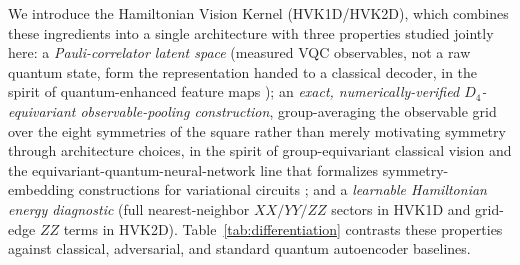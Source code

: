\documentclass[sn-mathphys,Numbered]{sn-jnl}
\begin{document}
We introduce the Hamiltonian Vision Kernel (HVK1D/HVK2D), which combines these ingredients into a single architecture with three properties studied jointly here: a \emph{Pauli-correlator latent space} (measured VQC observables, not a raw quantum state, form the representation handed to a classical decoder, in the spirit of quantum-enhanced feature maps \cite{Havlicek2019}); an \emph{exact, numerically-verified $D_4$-equivariant observable-pooling construction}, group-averaging the observable grid over the eight symmetries of the square rather than merely motivating symmetry through architecture choices, in the spirit of group-equivariant classical vision \cite{Cohen2016, Bronstein2021} and the equivariant-quantum-neural-network line that formalizes symmetry-embedding constructions for variational circuits \cite{Meyer2023, Nguyen2024EQNN, Schatzki2024, West2024}; and a \emph{learnable Hamiltonian energy diagnostic} (full nearest-neighbor $XX/YY/ZZ$ sectors in HVK1D and grid-edge $ZZ$ terms in HVK2D). Table~\ref{tab:differentiation} contrasts these properties against classical, adversarial, and standard quantum autoencoder baselines.
\end{document}
